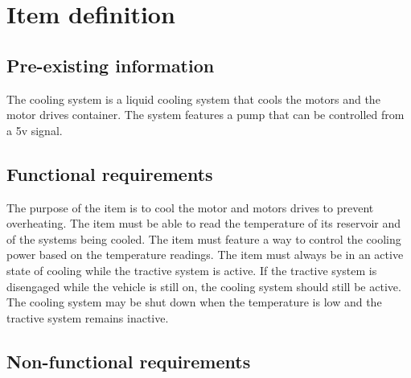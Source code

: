 \section{Item definition}

\subsection{Pre-existing information}

The cooling system is a liquid cooling system that cools the motors and the
motor drives container.
The system features a pump that can be controlled from a 5v signal.

\subsection{Functional requirements}
%
%

The purpose of the item is to cool the motor and motors drives to prevent overheating.
The item must be able to read the temperature of its reservoir and of the systems being cooled.
The item must feature a way to control the cooling power based on the temperature readings.
The item must always be in an active state of cooling while the tractive system is active.
If the tractive system is disengaged while the vehicle is still on,
the cooling system should still be active.
The cooling system may be shut down when the temperature is low and the
tractive system remains inactive.

\subsection{Non-functional requirements}
%
%
%


